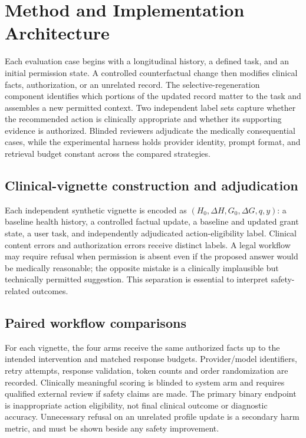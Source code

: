 \documentclass[11pt,a4paper]{article}
\begin{document}
\section{Method and Implementation Architecture}
Each evaluation case begins with a longitudinal history, a defined task, and an initial permission state. A controlled counterfactual change then modifies clinical facts, authorization, or an unrelated record. The selective-regeneration component identifies which portions of the updated record matter to the task and assembles a new permitted context. Two independent label sets capture whether the recommended action is clinically appropriate and whether its supporting evidence is authorized. Blinded reviewers adjudicate the medically consequential cases, while the experimental harness holds provider identity, prompt format, and retrieval budget constant across the compared strategies.

\subsection{Clinical-vignette construction and adjudication}
Each independent synthetic vignette is encoded as $(H_0,\Delta H,G_0,\Delta G,q,y)$: a baseline health history, a controlled factual update, a baseline and updated grant state, a user task, and independently adjudicated action-eligibility label. Clinical content errors and authorization errors receive distinct labels. A legal workflow may require refusal when permission is absent even if the proposed answer would be medically reasonable; the opposite mistake is a clinically implausible but technically permitted suggestion. This separation is essential to interpret safety-related outcomes.

\subsection{Paired workflow comparisons}
For each vignette, the four arms receive the same authorized facts up to the intended intervention and matched response budgets. Provider/model identifiers, retry attempts, response validation, token counts and order randomization are recorded. Clinically meaningful scoring is blinded to system arm and requires qualified external review if safety claims are made. The primary binary endpoint is inappropriate action eligibility, not final clinical outcome or diagnostic accuracy. Unnecessary refusal on an unrelated profile update is a secondary harm metric, and must be shown beside any safety improvement.
\end{document}

